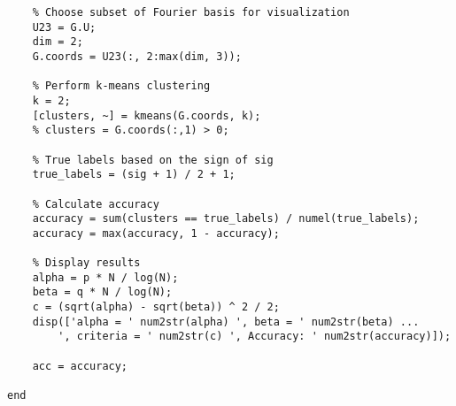 \documentclass{article}
\begin{document}
\begin{lstlisting}
    % Choose subset of Fourier basis for visualization
    U23 = G.U;
    dim = 2;
    G.coords = U23(:, 2:max(dim, 3));

    % Perform k-means clustering
    k = 2;
    [clusters, ~] = kmeans(G.coords, k);
    % clusters = G.coords(:,1) > 0;

    % True labels based on the sign of sig
    true_labels = (sig + 1) / 2 + 1;

    % Calculate accuracy
    accuracy = sum(clusters == true_labels) / numel(true_labels);
    accuracy = max(accuracy, 1 - accuracy);

    % Display results
    alpha = p * N / log(N);
    beta = q * N / log(N);
    c = (sqrt(alpha) - sqrt(beta)) ^ 2 / 2;
    disp(['alpha = ' num2str(alpha) ', beta = ' num2str(beta) ...
        ', criteria = ' num2str(c) ', Accuracy: ' num2str(accuracy)]);

    acc = accuracy;
    
end
\end{lstlisting}
\end{document}
